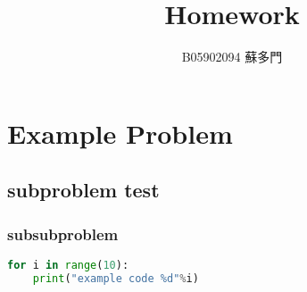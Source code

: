 \documentclass[a4paper]{article}
\title{\textbf{Homework}}
\author{B05902094 蘇多門}
\date{}
\begin{document}
\maketitle

\section{Example Problem}
\subsection{subproblem test}
\subsubsection{subsubproblem}
\begin{lstlisting}[language=Python]
for i in range(10):
	print("example code %d"%i)
\end{lstlisting}
\end{document}
